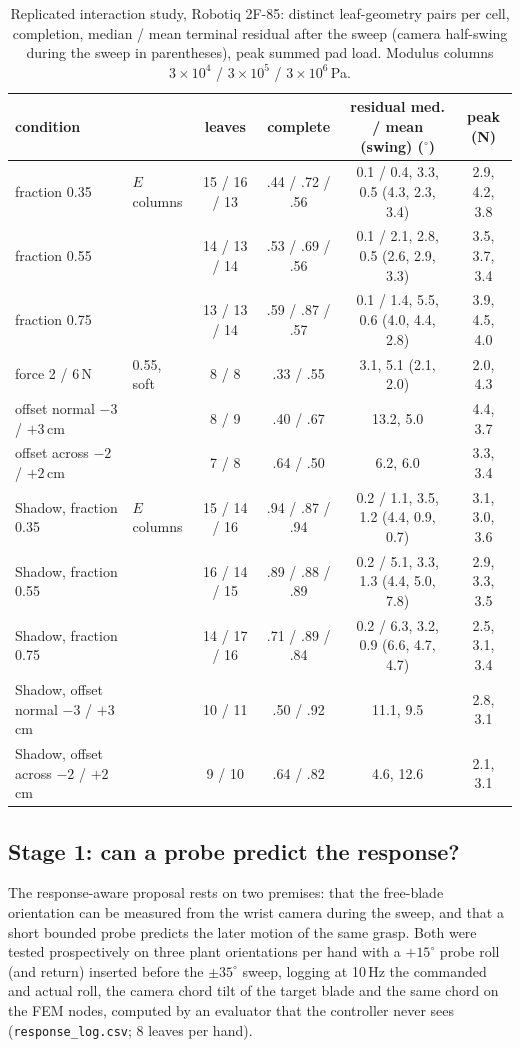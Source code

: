 \documentclass[letterpaper, 10 pt, conference]{ieeeconf}
\begin{document}
\begin{table}[t]
\caption{Replicated interaction study, Robotiq 2F-85: distinct leaf-geometry pairs per
cell, completion, median / mean terminal residual after the sweep (camera half-swing during
the sweep in parentheses), peak summed pad load. Modulus columns $3{\times}10^4$ / $3{\times}10^5$ / $3{\times}10^6$\,Pa.}
\label{tab:replicated}
\centering\scriptsize
\setlength{\tabcolsep}{3pt}
\begin{tabular}{@{}llcccc@{}}
\toprule
condition & & leaves & complete & residual med. / mean (swing) ($^\circ$) & peak (N) \\
\midrule
fraction 0.35 & $E$ columns & 15 / 16 / 13 & .44 / .72 / .56 & 0.1 / 0.4, 3.3, 0.5 (4.3, 2.3, 3.4) & 2.9, 4.2, 3.8 \\
fraction 0.55 & & 14 / 13 / 14 & .53 / .69 / .56 & 0.1 / 2.1, 2.8, 0.5 (2.6, 2.9, 3.3) & 3.5, 3.7, 3.4 \\
fraction 0.75 & & 13 / 13 / 14 & .59 / .87 / .57 & 0.1 / 1.4, 5.5, 0.6 (4.0, 4.4, 2.8) & 3.9, 4.5, 4.0 \\
force 2 / 6\,N & 0.55, soft & 8 / 8 & .33 / .55 & 3.1, 5.1 (2.1, 2.0) & 2.0, 4.3 \\
offset normal $-3$ / $+3$\,cm & & 8 / 9 & .40 / .67 & 13.2, 5.0 & 4.4, 3.7 \\
offset across $-2$ / $+2$\,cm & & 7 / 8 & .64 / .50 & 6.2, 6.0 & 3.3, 3.4 \\
\midrule
Shadow, fraction 0.35 & $E$ columns & 15 / 14 / 16 & .94 / .87 / .94 & 0.2 / 1.1, 3.5, 1.2 (4.4, 0.9, 0.7) & 3.1, 3.0, 3.6 \\
Shadow, fraction 0.55 & & 16 / 14 / 15 & .89 / .88 / .89 & 0.2 / 5.1, 3.3, 1.3 (4.4, 5.0, 7.8) & 2.9, 3.3, 3.5 \\
Shadow, fraction 0.75 & & 14 / 17 / 16 & .71 / .89 / .84 & 0.2 / 6.3, 3.2, 0.9 (6.6, 4.7, 4.7) & 2.5, 3.1, 3.4 \\
Shadow, offset normal $-3$ / $+3$\,cm & & 10 / 11 & .50 / .92 & 11.1, 9.5 & 2.8, 3.1 \\
Shadow, offset across $-2$ / $+2$\,cm & & 9 / 10 & .64 / .82 & 4.6, 12.6 & 2.1, 3.1 \\
\bottomrule
\end{tabular}
\end{table}

\subsection{Stage 1: can a probe predict the response?}\label{sec:stage1}
The response-aware proposal rests on two premises: that the free-blade orientation can be
measured from the wrist camera during the sweep, and that a short bounded probe predicts the
later motion of the same grasp. Both were tested prospectively on three plant orientations
per hand with a $+15^\circ$ probe roll (and return) inserted before the $\pm35^\circ$ sweep,
logging at 10\,Hz the commanded and actual roll, the camera chord tilt of the target blade
and the same chord on the FEM nodes, computed by an evaluator that the controller never
sees (\texttt{response\_log.csv}; 8 leaves per hand).
\end{document}
